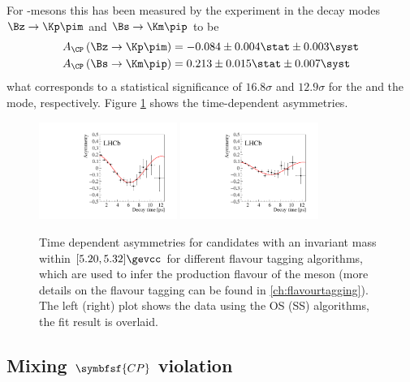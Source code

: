 For \B-mesons this has been measured by the \lhcb experiment in the decay modes $\Bz\to\Kp\pim$ and $\Bs\to\Km\pip$ \cite{LHCb-PAPER-2013-018} to be
\begin{equation}
\begin{split}
A_{\CP}\left(\Bz\to\Kp\pim\right) &= -0.084\pm0.004\stat \pm 0.003\syst\\
A_{\CP}\left(\Bs\to\Km\pip\right) &= 0.213\pm0.015\stat \pm 0.007\syst
\end{split}
\end{equation}
what corresponds to a statistical significance of $16.8\sigma$ and $12.9\sigma$ for the \Bz and the \Bs mode, respectively.
Figure \ref{fig:DirectCPV} shows the time-dependent asymmetries.
\begin{figure}[tbp]
	\centering
	\includegraphics[width=0.4\textwidth]{03CPV/figs/DirectCPV_1.pdf}
	\includegraphics[width=0.4\textwidth]{03CPV/figs/DirectCPV_2.pdf}
	\caption{Time dependent asymmetries for \Kp\pim candidates with an invariant mass within $[5.20, 5.32]\gevcc$ for different flavour tagging algorithms, which are used to infer the production flavour of the \Bq meson (more details on the flavour tagging can be found in \cref{ch:flavourtagging}). The left (right) plot shows the data using the OS (SS) algorithms, the fit result is overlaid.}
	\label{fig:DirectCPV}
\end{figure}


\subsection[head={Mixing \CP violation},tocentry={Mixing \CP violation}]{Mixing $\symbfsf{C{}P}$ violation}
\label{sec:MixingCPV}

